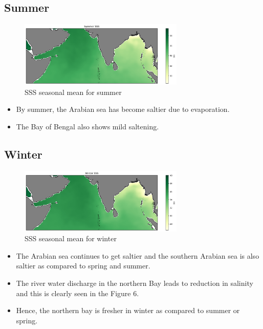 \documentclass[20pt]{article}
\begin{document}
\subsection*{Summer}

\begin{figure}
    \centering
    \includegraphics[width=0.7\textwidth]{summer_sss.png}
    \caption{SSS seasonal mean for summer}
\end{figure}

\begin{itemize}
    \item By summer, the Arabian sea has become saltier due to evaporation.
    \item The Bay of Bengal also shows mild saltening.
\end{itemize}

\subsection*{Winter}

\begin{figure}
    \centering
    \includegraphics[width=0.7\textwidth]{winter_sss.png}
    \caption{SSS seasonal mean for winter}
\end{figure}

\begin{itemize}
    \item The Arabian sea continues to get saltier and the southern Arabian sea is also saltier as compared to spring and summer.
    \item The river water discharge in the northern Bay leads to reduction in salinity and this is clearly seen in the Figure 6.
    \item Hence, the northern bay is fresher in winter as compared to summer or spring.
\end{itemize}
\end{document}
